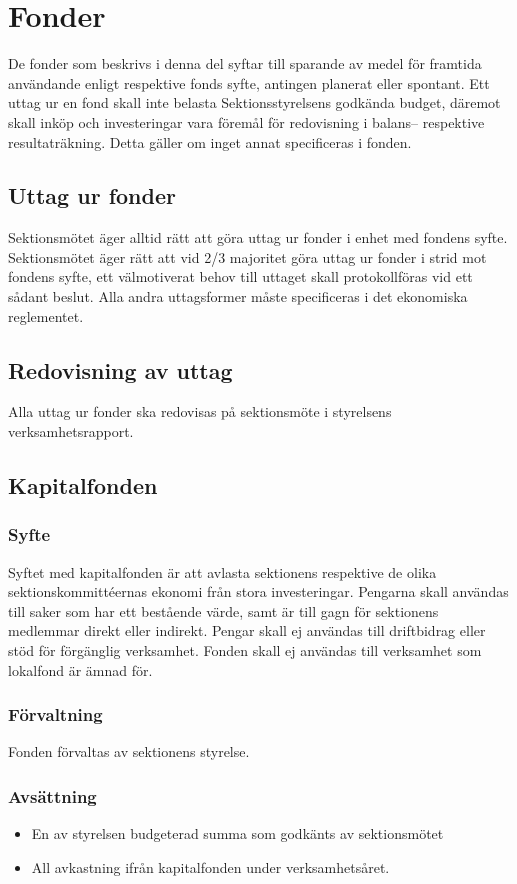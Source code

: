 \documentclass[a4paper, 10pt]{article}
\begin{document}
\section{Fonder}
De fonder som beskrivs i denna del syftar till sparande av medel för framtida användande enligt respektive fonds syfte, antingen planerat eller spontant. Ett uttag ur en fond skall inte belasta Sektionsstyrelsens godkända budget, däremot skall inköp och investeringar vara föremål för redovisning i balans– respektive resultaträkning. Detta gäller om inget annat specificeras i fonden.

\subsection{Uttag ur fonder}
Sektionsmötet äger alltid rätt att göra uttag ur fonder i enhet med fondens syfte. Sektionsmötet äger rätt att vid 2/3 majoritet göra uttag ur fonder i strid mot fondens syfte, ett välmotiverat behov till uttaget skall protokollföras vid ett sådant beslut. Alla andra uttagsformer måste specificeras i det ekonomiska reglementet.

\subsection{Redovisning av uttag}
Alla uttag ur fonder ska redovisas på sektionsmöte i styrelsens verksamhetsrapport.

\subsection{Kapitalfonden}
\subsubsection{Syfte}
\label{sec:kapitalfond_syfte}
Syftet med kapitalfonden är att avlasta sektionens respektive de olika sektionskommittéernas ekonomi från stora investeringar. Pengarna skall användas till saker som har ett bestående värde, samt är till gagn för sektionens medlemmar direkt eller indirekt. Pengar skall ej användas till driftbidrag eller stöd för förgänglig verksamhet. Fonden skall ej användas till verksamhet som lokalfond är ämnad för.
\subsubsection{Förvaltning}
Fonden förvaltas av sektionens styrelse.
\subsubsection{Avsättning}
\begin{itemize}
\item En av styrelsen budgeterad summa som godkänts av sektionsmötet
\item All avkastning ifrån kapitalfonden under verksamhetsåret.
\end{itemize}
\end{document}
